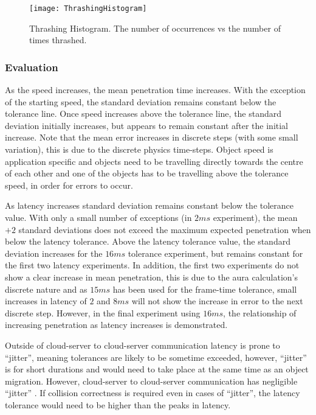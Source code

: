 \begin{figure}[t]
	\centering
	\texttt{[image: ThrashingHistogram]}
	\caption{Thrashing Histogram. The number of occurrences vs the number of times thrashed.}
	\label{fig_ThrashingHistogram}
\end{figure}


\subsubsection{Evaluation}
As the speed increases, the mean penetration time increases. With the exception of the starting speed, the standard deviation remains constant below the tolerance line. Once speed increases above the tolerance line, the standard deviation initially increases, but appears to remain constant after the initial increase. Note that the mean error increases in discrete steps (with some small variation), this is due to the discrete physics time-steps. Object speed is application specific and objects need to be travelling directly towards the centre of each other and one of the objects has to be travelling above the tolerance speed, in order for errors to occur.

As latency increases standard deviation remains constant below the tolerance value. With only a small number of exceptions (in $2ms$ experiment), the mean $+2$ standard deviations does not exceed the maximum expected penetration when below the latency tolerance. Above the latency tolerance value, the standard deviation increases for the $16ms$ tolerance experiment, but remains constant for the first two latency experiments. In addition, the first two experiments do not show a clear increase in mean penetration, this is due to the aura calculation's discrete nature and as $15ms$ has been used for the frame-time tolerance, small increases in latency of $2$ and $8ms$ will not show the increase in error to the next discrete step. However, in the final experiment using $16ms$, the relationship of increasing penetration as latency increases is demonstrated.

Outside of cloud-server to cloud-server communication latency is prone to ``jitter'', meaning tolerances are likely to be sometime exceeded, however, ``jitter'' is for short durations and would need to take place at the same time as an object migration. However, cloud-server to cloud-server communication has negligible ``jitter'' \cite{ThousandEyesCloudPerf2018}. If collision correctness is required even in cases of ``jitter'', the latency tolerance would need to be higher than the peaks in latency. 

